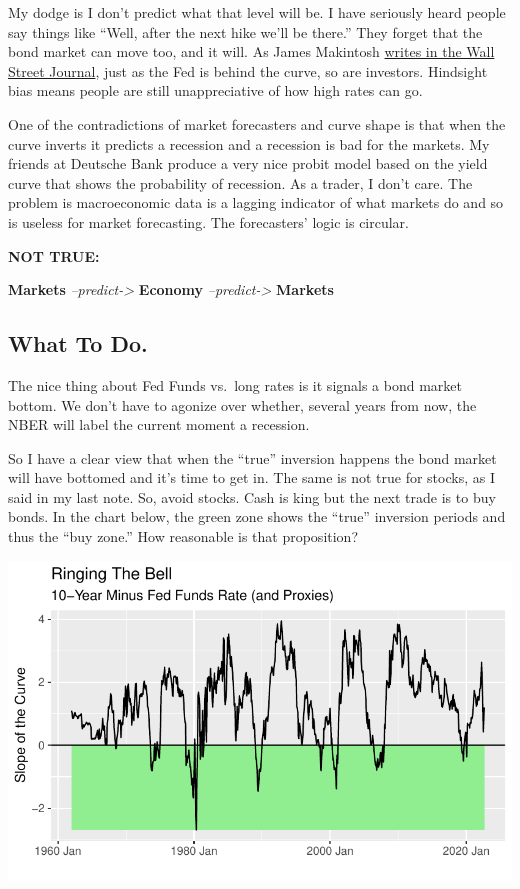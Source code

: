 \documentclass[
  letterpaper,
  DIV=11,
  numbers=noendperiod]{scrartcl}
\begin{document}
My dodge is I don't predict what that level will be. I have seriously
heard people say things like ``Well, after the next hike we'll be
there.'' They forget that the bond market can move too, and it will. As
James Makintosh
\href{https://www.wsj.com/articles/markets-keep-making-the-same-mistake-about-inflation-11663163494?mod=markets_lead_pos6}{writes
in the Wall Street Journal}, just as the Fed is behind the curve, so are
investors. Hindsight bias means people are still unappreciative of how
high rates can go.

One of the contradictions of market forecasters and curve shape is that
when the curve inverts it predicts a recession and a recession is bad
for the markets. My friends at Deutsche Bank produce a very nice probit
model based on the yield curve that shows the probability of recession.
As a trader, I don't care. The problem is macroeconomic data is a
lagging indicator of what markets do and so is useless for market
forecasting. The forecasters' logic is circular.

\textbf{NOT TRUE:}

\textbf{Markets} \emph{--predict-\textgreater{}} \textbf{Economy}
\emph{--predict-\textgreater{}} \textbf{Markets}

\hypertarget{what-to-do.}{%
\subsection{What To Do.}\label{what-to-do.}}

The nice thing about Fed Funds vs.~long rates is it signals a bond
market bottom. We don't have to agonize over whether, several years from
now, the NBER will label the current moment a recession.

So I have a clear view that when the ``true'' inversion happens the bond
market will have bottomed and it's time to get in. The same is not true
for stocks, as I said in my last note. So, avoid stocks. Cash is king
but the next trade is to buy bonds. In the chart below, the green zone
shows the ``true'' inversion periods and thus the ``buy zone.'' How
reasonable is that proposition?

\includegraphics{thoughts_on_rates_pt2_files/figure-pdf/ring_the_bell-1.pdf}
\end{document}
